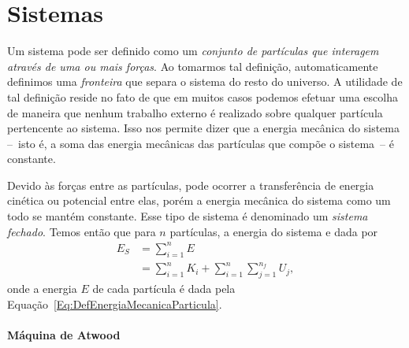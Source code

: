 

\section{Sistemas}
\label{Sec:Sistemas}

Um sistema pode ser definido como um \emph{conjunto de partículas que interagem através de uma ou mais forças}. Ao tomarmos tal definição, automaticamente definimos uma \emph{fronteira} que separa o sistema do resto do universo. A utilidade de tal definição reside no fato de que em muitos casos podemos efetuar uma escolha de maneira que nenhum trabalho externo é realizado sobre qualquer partícula pertencente ao sistema. Isso nos permite dizer que a energia mecânica do sistema --~isto é, a soma das energia mecânicas das partículas que compõe o sistema~-- é constante.

Devido às forças entre as partículas, pode ocorrer a transferência de energia cinética ou potencial entre elas, porém a energia mecânica do sistema como um todo se mantém constante. Esse tipo de sistema é denominado um \emph{sistema fechado}. Temos então que para $n$ partículas, a energia do sistema e dada por
\begin{align}
    E_S &= \sum_{i = 1}^{n} E\\
    &= \sum_{i = 1}^{n} K_i + \sum_{i = 1}^n \sum_{j = 1}^{n_f} U_j,
\end{align}
%
onde a energia $E$ de cada partícula é dada pela Equação~\ref{Eq:DefEnergiaMecanicaParticula}.

\paragraph{Máquina de Atwood}

